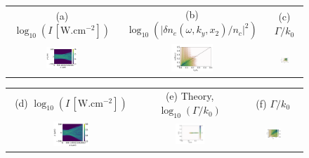 \documentclass[
 reprint,
 superscriptaddress,
 amsmath,amssymb,
 aps,
]{revtex4-1}
\begin{document}
\begin{figure}
\begin{tabular}{ccc}
(a) $\log_{10}(I \,[\mathrm{W.cm^{-2}}] )$&
(b) $\log_{10}(\vert\delta n_e(\omega,k_y,x_2)/n_c\vert^2)$ &
(c) $\Gamma/k_0$\\ 
\includegraphics[width=0.3\textwidth]{Fig7a.png}
&\includegraphics[width=0.3\textwidth]{Fig7b.png}
&\includegraphics[width=0.3\textwidth]{Fig7c.png}
\end{tabular}
\begin{tabular}{ccc}
(d) $\log_{10}(I \,[\mathrm{W.cm^{-2}}] )$&
(e) Theory, $\log_{10}(\Gamma/k_0)$ &
(f) $\Gamma/k_0$\\ 
\includegraphics[width=0.3\textwidth]{Fig7d.png}
&\includegraphics[width=0.3\textwidth]{Fig7e.png}
&\includegraphics[width=0.3\textwidth]{Fig7f.png}

\end{tabular}
\end{figure}
\end{document}
